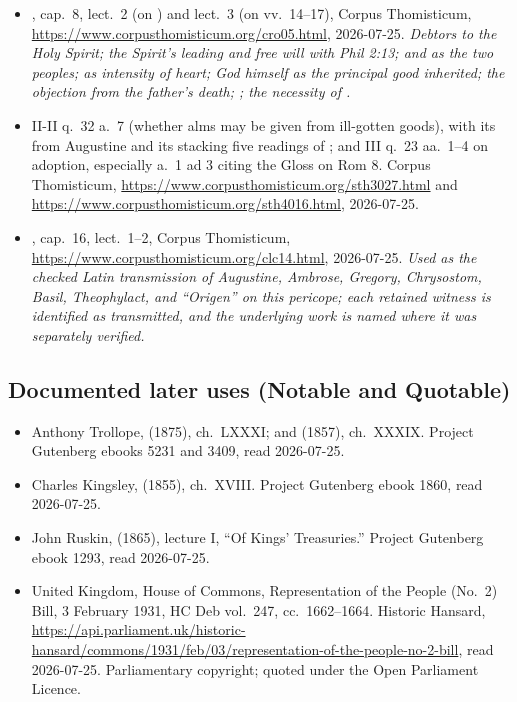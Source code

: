 \begin{itemize}[leftmargin=1.3em, itemsep=0.25em]
\item {}, cap.\ 8, lect.\ 2 (on ) and lect.\ 3 (on vv.\ 14--17), Corpus Thomisticum,
\url{https://www.corpusthomisticum.org/cro05.html}, 2026-07-25. \emph{Debtors to
the Holy Spirit; the Spirit's leading and free will with Phil 2:13; 
and  as the two peoples;  as intensity of heart;
God himself as the principal good inherited; the objection from the father's
death; ; the necessity of .}
\item {} II-II q.\ 32 a.\ 7 (whether alms may be given from
ill-gotten goods), with its  from Augustine and its  stacking five readings of ; and III q.\ 23 aa.\
1--4 on adoption, especially a.\ 1 ad 3 citing the Gloss on Rom 8. Corpus
Thomisticum, \url{https://www.corpusthomisticum.org/sth3027.html} and
\url{https://www.corpusthomisticum.org/sth4016.html}, 2026-07-25.
\item \work{Catena aurea in Lucam}, cap.\ 16, lect.\ 1--2, Corpus Thomisticum,
\url{https://www.corpusthomisticum.org/clc14.html}, 2026-07-25. \emph{Used as
the checked Latin transmission of Augustine, Ambrose, Gregory, Chrysostom,
Basil, Theophylact, and ``Origen'' on this pericope; each retained witness is
identified as transmitted, and the underlying work is named where it was
separately verified.}
\end{itemize}

\subsection*{Documented later uses (Notable and Quotable)}

\begin{itemize}[leftmargin=1.3em, itemsep=0.25em]
\item Anthony Trollope,  (1875), ch.\ LXXXI; and
\work{Barchester Towers} (1857), ch.\ XXXIX. Project Gutenberg ebooks 5231 and
3409, read 2026-07-25.
\item Charles Kingsley,  (1855), ch.\ XVIII. Project
Gutenberg ebook 1860, read 2026-07-25.
\item John Ruskin,  (1865), lecture I, ``Of Kings'
Treasuries.'' Project Gutenberg ebook 1293, read 2026-07-25.
\item United Kingdom, House of Commons, Representation of the People (No.\ 2)
Bill, 3 February 1931, HC Deb vol.\ 247, cc.\ 1662--1664. Historic Hansard,
\url{https://api.parliament.uk/historic-hansard/commons/1931/feb/03/representation-of-the-people-no-2-bill},
read 2026-07-25. Parliamentary copyright; quoted under the Open Parliament
Licence.
\end{itemize}

\clearpage
